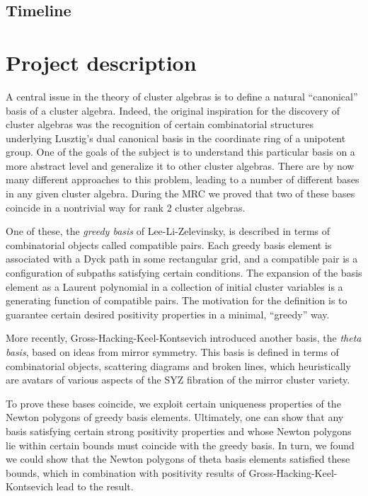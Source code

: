 \documentclass{amsart}
\begin{document}
  \subsection*{Timeline}

  \section*{Project description}

    A central issue in the theory of cluster algebras is to define a natural
    ``canonical'' basis of a cluster algebra.
    Indeed, the original inspiration for the discovery of cluster algebras was
    the recognition of certain combinatorial structures underlying Lusztig's
    dual canonical basis in the coordinate ring of a unipotent group.
    One of the goals of the subject is to understand this particular basis on a
    more abstract level and generalize it to other cluster algebras.
    There are by now many different approaches to this problem, leading to a
    number of different bases in any given cluster algebra.
    During the MRC we proved that two of these bases coincide in a nontrivial
    way for rank 2 cluster algebras.

    One of these, the \emph{greedy basis} of Lee-Li-Zelevinsky, is described in
    terms of combinatorial objects called compatible pairs.
    Each greedy basis element is associated with a Dyck path in some rectangular
    grid, and a compatible pair is a configuration of subpaths satisfying
    certain conditions.
    The expansion of the basis element as a Laurent polynomial in a collection
    of initial cluster variables is a generating function of compatible pairs.
    The motivation for the definition is to guarantee certain desired positivity
    properties in a minimal, ``greedy'' way.

    More recently, Gross-Hacking-Keel-Kontsevich introduced another basis, the
    \emph{theta basis}, based on ideas from mirror symmetry.
    This basis is defined in terms of combinatorial objects, scattering diagrams
    and broken lines, which heuristically are avatars of various aspects of the
    SYZ fibration of the mirror cluster variety.
    
    To prove these bases coincide, we exploit certain uniqueness properties of
    the Newton polygons of greedy basis elements.
    Ultimately, one can show that any basis satisfying certain strong positivity
    properties and whose Newton polygons lie within certain bounds must coincide
    with the greedy basis.
    In turn, we found we could show that the Newton polygons of theta basis
    elements satisfied these bounds, which in combination with positivity
    results of Gross-Hacking-Keel-Kontsevich lead to the result.
    
\end{document}
